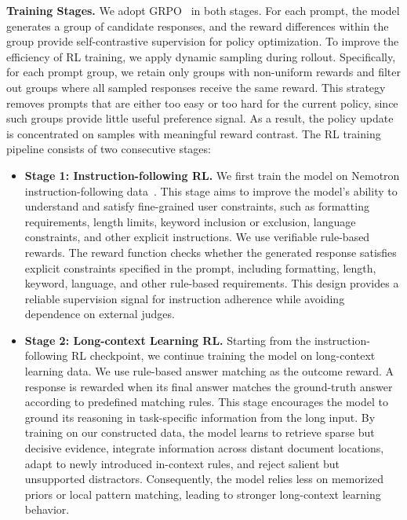 \textbf{Training Stages.} We adopt GRPO~\citep{shao2024deepseekmath} in both stages. For each prompt, the model generates a group of candidate responses, and the reward differences within the group provide self-contrastive supervision for policy optimization. To improve the efficiency of RL training, we apply dynamic sampling during rollout. Specifically, for each prompt group, we retain only groups with non-uniform rewards and filter out groups where all sampled responses receive the same reward. This strategy removes prompts that are either too easy or too hard for the current policy, since such groups provide little useful preference signal. As a result, the policy update is concentrated on samples with meaningful reward contrast. The RL training pipeline consists of two consecutive stages:
\begin{itemize}
    \item \textbf{Stage 1: Instruction-following RL.} 
    We first train the model on Nemotron instruction-following data~\citep{nemo-gym}. This stage aims to improve the model's ability to understand and satisfy fine-grained user constraints, such as formatting requirements, length limits, keyword inclusion or exclusion, language constraints, and other explicit instructions.  We use verifiable rule-based rewards. The reward function checks whether the generated response satisfies explicit constraints specified in the prompt, including formatting, length, keyword, language, and other rule-based requirements. This design provides a reliable supervision signal for instruction adherence while avoiding dependence on external judges.

    \item \textbf{Stage 2: Long-context Learning RL.}
    Starting from the instruction-following RL checkpoint, we continue training the model on long-context learning data. We use rule-based answer matching as the outcome reward. A response is rewarded when its final answer matches the ground-truth answer according to predefined matching rules. This stage encourages the model to ground its reasoning in task-specific information from the long input. By training on our constructed data, the model learns to retrieve sparse but decisive evidence, integrate information across distant document locations, adapt to newly introduced in-context rules, and reject salient but unsupported distractors. Consequently, the model relies less on memorized priors or local pattern matching, leading to stronger long-context learning behavior.
\end{itemize}


